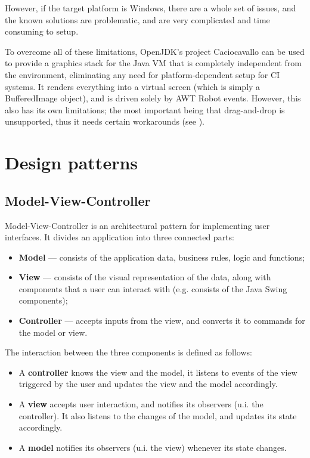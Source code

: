 However, if the target platform is Windows, there are a whole set of issues, and the known solutions are problematic, and are very complicated and time consuming to setup. \cite{HudsonUnderWindows} \cite{Cacio_Tta_FEST}

To overcome all of these limitations, OpenJDK's project Caciocavallo can be used \cite{Cacio_Tta_FEST} to provide a graphics stack for the Java VM that is completely independent from the environment, eliminating any need for platform-dependent setup for CI systems. It renders everything into a virtual screen (which is simply a BufferedImage object), and is driven solely by AWT Robot events. However, this also has its own limitations; the most important being that drag-and-drop \cite{IntroDnD} is unsupported, thus it needs certain workarounds (see ).

\section{Design patterns}\label{sec:theory_design-patterns}

\subsection{Model-View-Controller}\label{sec:model-view-controller}

Model-View-Controller is an architectural pattern for implementing user interfaces. It divides an application into three connected parts:
\begin{itemize}
\item \textbf{Model} --- consists of the application data, business rules, logic and functions;
\item \textbf{View} --- consists of the visual representation of the data, along with components that a user can interact with (e.g. consists of the Java Swing components);
\item \textbf{Controller} --- accepts inputs from the view, and converts it to commands for the model or view.
\end{itemize}

The interaction between the three components is defined as follows:
\begin{itemize}
\item A \textbf{controller} knows the view and the model, it listens to events of the view triggered by the user and updates the view and the model accordingly.
\item A \textbf{view} accepts user interaction, and notifies its observers (u.i. the controller). It also listens to the changes of the model, and updates its state accordingly.
\item A \textbf{model} notifies its observers (u.i. the view) whenever its state changes.
\end{itemize}

